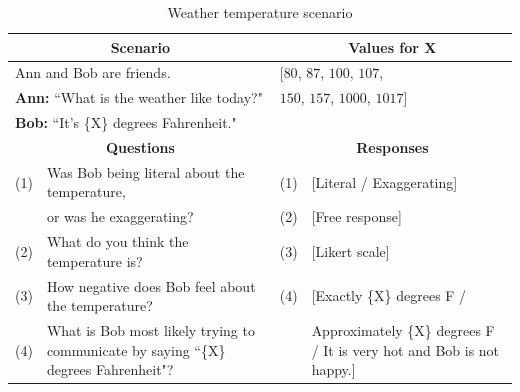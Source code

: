 \documentclass{article} %
\begin{document}
\begin{table}[h]
\begin{tabular}{| p{0.15cm}  p{8.15cm}| p{0.15cm}p{4cm} |}\hline
\multicolumn{2}{|c|}{\textbf{Scenario}} & \multicolumn{2}{c|}{\textbf{Values for X}} \\\hline
\multicolumn{2}{|l|}{Ann and Bob are friends.} & \multicolumn{2}{l|}{[$80$, $87$, $100$, $107$,}\\
\multicolumn{2}{|l|}{\textbf{Ann:} ``What is the weather like today?"} & \multicolumn{2}{l|}{$150$, $157$, $1000$, $1017$]}\\
\multicolumn{2}{|l|}{\textbf{Bob:} ``It's \{X\} degrees Fahrenheit."} & \multicolumn{2}{l|}{}\\\hline
\multicolumn{2}{|c|}{\textbf{Questions}} & \multicolumn{2}{c|}{\textbf{Responses}} \\\hline
(1) & Was Bob being literal about the temperature, & (1) &[Literal / Exaggerating] \\
 & or was he exaggerating? & (2) & [Free response] \\
(2) & What do you think the temperature is? & (3) & [Likert scale] \\
(3) & How negative does Bob feel about the temperature? & (4) & [Exactly \{X\} degrees F / \\
(4) & What is Bob most likely trying to communicate by saying  ``\{X\} degrees Fahrenheit"? & & Approximately \{X\} degrees F / It is very hot and Bob is not happy.]\\\hline
\end{tabular}
\caption{Weather temperature scenario}
\label{tab:weathertable}
\end{table}

\clearpage
\end{document}
